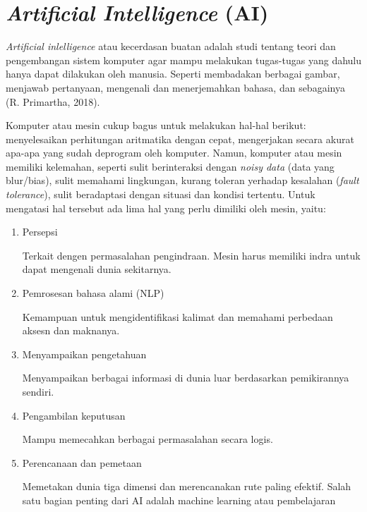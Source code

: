 \section{\textit{Artificial Intelligence} (AI)}
\hspace{1,2cm}\textit{Artificial inlelligence} atau kecerdasan buatan adalah studi tentang teori dan pengembangan sistem komputer agar mampu melakukan tugas-tugas yang dahulu hanya dapat dilakukan oleh manusia. Seperti membadakan berbagai gambar, menjawab pertanyaan, mengenali dan menerjemahkan bahasa, dan sebagainya (R. Primartha, 2018). 

Komputer atau mesin cukup bagus untuk melakukan hal-hal berikut: menyelesaikan perhitungan aritmatika dengan cepat, mengerjakan secara akurat apa-apa yang sudah deprogram oleh komputer. Namun, komputer atau mesin memiliki kelemahan, seperti sulit berinteraksi dengan \textit{noisy data} (data yang blur/bias), sulit memahami lingkungan, kurang toleran yerhadap kesalahan (\textit{fault tolerance}), sulit beradaptasi dengan situasi dan kondisi tertentu. Untuk mengatasi hal tersebut ada lima hal yang perlu dimiliki oleh mesin, yaitu:

\begin{enumerate}
	\item Persepsi
	
	Terkait dengen permasalahan pengindraan. Mesin harus memiliki indra untuk dapat mengenali dunia sekitarnya.
	
	\item Pemrosesan bahasa alami (NLP)
	
	Kemampuan untuk mengidentifikasi kalimat dan memahami perbedaan aksesn dan maknanya.
	
	\item Menyampaikan pengetahuan
	
	Menyampaikan berbagai informasi di dunia luar berdasarkan pemikirannya sendiri.
	
	\item Pengambilan keputusan
	
	Mampu memecahkan berbagai permasalahan secara logis.
	
	\item Perencanaan dan pemetaan
	
	Memetakan dunia tiga dimensi dan merencanakan rute paling efektif.
	Salah satu bagian penting dari AI adalah machine learning atau pembelajaran 
\end{enumerate}

